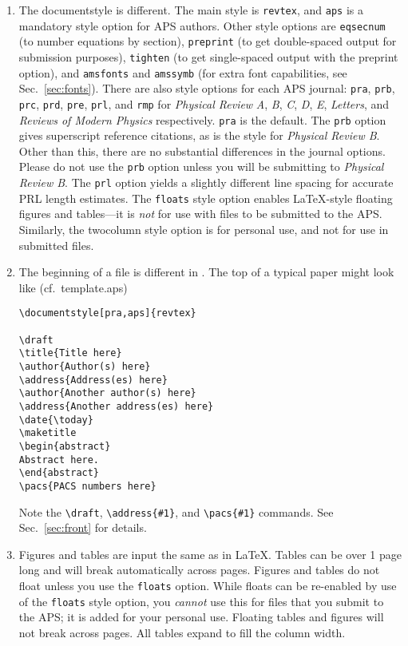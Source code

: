 \begin{enumerate}
\item The documentstyle is different. The main style is \verb+revtex+, and
\verb+aps+ is a mandatory style option for APS authors. Other style options
are \verb+eqsecnum+ (to number equations by section), \verb+preprint+ (to
get double-spaced output for submission purposes), \verb+tighten+ (to get
single-spaced output with the preprint option), and \verb+amsfonts+ and
\verb+amssymb+ (for extra font capabilities, see Sec.\ \ref{sec:fonts}).
There are also style options for each APS journal: \verb+pra+, \verb+prb+,
\verb+prc+, \verb+prd+, \verb+pre+, \verb+prl+, and \verb+rmp+ for 
{\it Physical
Review\/} {\it A}, {\it B}, {\it C}, {\it D}, {\it E}, {\it Letters},
and {\it Reviews of Modern Physics} respectively. \verb+pra+ is the default. The \verb+prb+
option gives superscript reference citations, as is the style for {\it
Physical Review B}. Other than this, there are no substantial
differences in the journal options. Please do not use the \verb+prb+
option unless you will be submitting to {\it Physical Review B}. The
\verb+prl+ option yields a slightly different line spacing for
accurate PRL length estimates. The
\verb+floats+ style option enables \LaTeX{}-style floating figures and
tables---it is {\it not\/} for use with files to be submitted to the
APS. Similarly, the twocolumn style option is for personal use, and
not for use in submitted files. 

\item The beginning of a file is different in \REVTeX. The top of a typical
paper might look like (cf.\ template.aps)
\begin{verbatim}
\documentstyle[pra,aps]{revtex}

\draft
\title{Title here}
\author{Author(s) here}
\address{Address(es) here}
\author{Another author(s) here}
\address{Another address(es) here}
\date{\today}
\maketitle
\begin{abstract}
Abstract here.
\end{abstract}
\pacs{PACS numbers here}
\end{verbatim}
Note the \verb+\draft+, \verb+\address{#1}+, and \verb+\pacs{#1}+ commands.
See Sec.\ \ref{sec:front} for details.

\item Figures and tables are input the same as in \LaTeX{}. Tables can be
over 1 page long and will break automatically across pages. Figures and
tables do not float unless you use the \verb+floats+ option. While floats can be re-enabled by use of the \verb+floats+ style
option, you {\em cannot\/} use this for files that you submit to the APS;
it is added for your personal use. Floating tables and figures will not
break across pages. All tables expand to fill the column width.


\end{enumerate}
